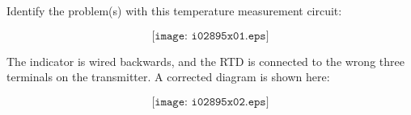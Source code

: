 

Identify the problem(s) with this temperature measurement circuit:

$$\texttt{[image: i02895x01.eps]}$$







The indicator is wired backwards, and the RTD is connected to the wrong three terminals on the transmitter.  A corrected diagram is shown here:
 
$$\texttt{[image: i02895x02.eps]}$$











